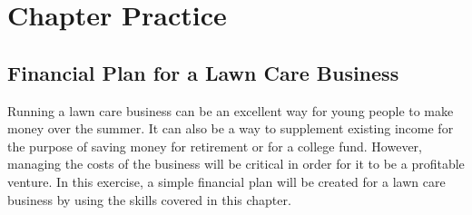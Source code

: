 \section{Chapter Practice}

\subsection{Financial Plan for a Lawn Care Business}

Running a lawn care business can be an excellent way for young people to make money over the summer. It can also be a way to supplement existing income for the purpose of saving money for retirement or for a college fund. However, managing the costs of the business will be critical in order for it to be a profitable venture. In this exercise, a simple financial plan will be created for a lawn care business by using the skills covered in this chapter.


